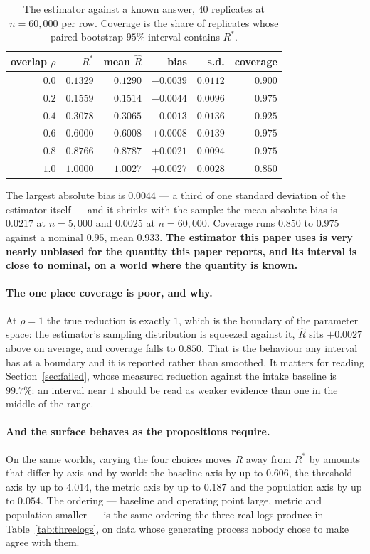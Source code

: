 \documentclass[preprint,12pt]{elsarticle}
\begin{document}
\begin{table}[htbp]
\centering
\caption{The estimator against a known answer, $40$ replicates at
$n = 60{,}000$ per row. Coverage is the share of replicates whose paired
bootstrap $95\%$ interval contains $R^{*}$.}
\label{tab:sim}
\begin{tabular}{rrrrrr}
\toprule
overlap $\rho$ & $R^{*}$ & mean $\hat{R}$ & bias & s.d. & coverage \\
\midrule
$0.0$ & $0.1329$ & $0.1290$ & $-0.0039$ & $0.0112$ & $0.900$ \\
$0.2$ & $0.1559$ & $0.1514$ & $-0.0044$ & $0.0096$ & $0.975$ \\
$0.4$ & $0.3078$ & $0.3065$ & $-0.0013$ & $0.0136$ & $0.925$ \\
$0.6$ & $0.6000$ & $0.6008$ & $+0.0008$ & $0.0139$ & $0.975$ \\
$0.8$ & $0.8766$ & $0.8787$ & $+0.0021$ & $0.0094$ & $0.975$ \\
$1.0$ & $1.0000$ & $1.0027$ & $+0.0027$ & $0.0028$ & $0.850$ \\
\bottomrule
\end{tabular}
\end{table}

The largest absolute bias is $0.0044$ --- a third of one standard deviation of
the estimator itself --- and it shrinks with the sample: the mean absolute
bias is $0.0217$ at $n = 5{,}000$ and $0.0025$ at $n = 60{,}000$. Coverage
runs $0.850$ to $0.975$ against a nominal $0.95$, mean $0.933$. \textbf{The
estimator this paper uses is very nearly unbiased for the quantity this paper
reports, and its interval is close to nominal, on a world where the quantity
is known.}

\paragraph{The one place coverage is poor, and why.} At $\rho = 1$ the true
reduction is exactly $1$, which is the boundary of the parameter space: the
estimator's sampling distribution is squeezed against it, $\hat{R}$ sits
$+0.0027$ above on average, and coverage falls to $0.850$. That is the
behaviour any interval has at a boundary and it is reported rather than
smoothed. It matters for reading Section~\ref{sec:failed}, whose measured
reduction against the intake baseline is $99.7\%$: an interval near $1$ should
be read as weaker evidence than one in the middle of the range.

\paragraph{And the surface behaves as the propositions require.} On the same
worlds, varying the four choices moves $R$ away from $R^{*}$ by amounts that
differ by axis and by world: the baseline axis by up to $0.606$, the threshold
axis by up to $4.014$, the metric axis by up to $0.187$ and the population
axis by up to $0.054$. The ordering --- baseline and operating point large,
metric and population smaller --- is the same ordering the three real logs
produce in Table~\ref{tab:threelogs}, on data whose generating process nobody
chose to make agree with them.
\end{document}
